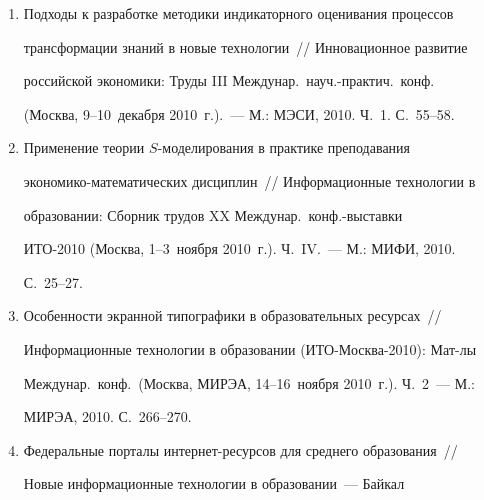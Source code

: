 \begin{enumerate}[1.]
распределения~/\!\!/  Обозрение прикладной и промышленной математики, 


2010. Т.~17. Вып.~2. XVII Всеросс.\ школа-коллоквиум по стохастическим 


методам; XI Всеросс.\ симпозиум по прикладной и промышленной 


математике (весенняя сессия) и II Региональный макросимпозиум 


<<Насущные задачи прикладной математики в Ставрополье>> (Кисловодск, 


1--8~мая 2010~г.): Тезисы докладов. Ч.~I. С.~278--279.


\item {}


Подходы к разработке методики индикаторного оценивания процессов 


трансформации знаний в новые технологии~/\!\!/  Инновационное развитие 


российской экономики: Труды III Междунар.\ науч.-практич.\ конф.\  


(Москва, 9--10~декабря 2010~г.).~--- М.: МЭСИ, 2010. Ч.~1. С.~55--58.


\item {}


Применение теории $S$-моделирования в практике преподавания 


эко\-но\-ми\-ко-математических дисциплин~/\!\!/  Информационные технологии в 


образовании: Сборник трудов XX Междунар.\ конф.-выставки 


ИТО-2010 (Москва, 1--3~ноября 2010~г.). Ч.~IV.~--- М.: МИФИ, 2010. 


С.~25--27.


\item {}


Особенности экранной типографики в образовательных ресурсах~/\!\!/  


Информационные технологии в образовании (ИТО-Москва-2010): Мат-лы 


Междунар.\ конф.\ (Москва, МИРЭА, 14--16~ноября 2010~г.). Ч.~2~--- М.: 


МИРЭА, 2010. С.~266--270.


\item {}


Федеральные порталы интернет-ресурсов для среднего образования~/\!\!/  


Новые информационные технологии в образовании~--- Байкал 



\end{enumerate}

